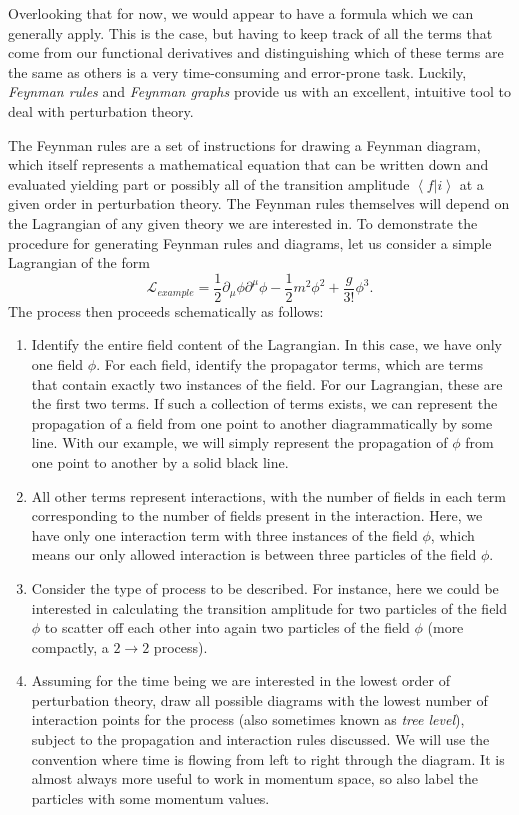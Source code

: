 Overlooking that for now, we would appear to have a formula which we can generally apply. This is the case, but having to keep track of all the terms that come from our functional derivatives and distinguishing which of these terms are the same as others is a very time-consuming and error-prone task. Luckily, \emph{Feynman rules} and \emph{Feynman graphs} provide us with an excellent, intuitive tool to deal with perturbation theory. 

The Feynman rules are a set of instructions for drawing a Feynman diagram, which itself represents a mathematical equation that can be written down and evaluated yielding part or possibly all of the transition amplitude $\left<f | i \right>$ at a given order in perturbation theory. The Feynman rules themselves will depend on the Lagrangian of any given theory we are interested in. To demonstrate the procedure for generating Feynman rules and diagrams, let us consider a simple Lagrangian of the form
\begin{equation}
\mathscr{L}_{example} = \frac{1}{2}\partial_\mu \phi \partial^\mu \phi - \frac{1}{2}m^2 \phi^2 + \frac{g}{3!} \phi^3. 
\end{equation}
The process then proceeds schematically as follows:

\begin{enumerate}
\item{Identify the entire field content of the Lagrangian. In this case, we have only one field $\phi$. For each field, identify the propagator terms, which are terms that contain exactly two instances of the field. For our Lagrangian, these are the first two terms. If such a collection of terms exists, we can represent the propagation of a field from one point to another diagrammatically by some line. With our example, we will simply represent the propagation of $\phi$ from one point to another by a solid black line.}
\item{All other terms represent interactions, with the number of fields in each term corresponding to the number of fields present in the interaction. Here, we have only one interaction term with three instances of the field $\phi$, which means our only allowed interaction is between three particles of the field $\phi$.}
\item{Consider the type of process to be described. For instance, here we could be interested in calculating the transition amplitude for two particles of the field $\phi$ to scatter off each other into again two particles of the field $\phi$ (more compactly, a $2 \to 2$ process).}
\item{Assuming for the time being we are interested in the lowest order of perturbation theory, draw all possible diagrams with the lowest number of interaction points for the process (also sometimes known as \emph{tree level}), subject to the propagation and interaction rules discussed. We will use the convention where time is flowing from left to right through the diagram. It is almost always more useful to work in momentum space, so also label the particles with some momentum values. }
\end{enumerate}

